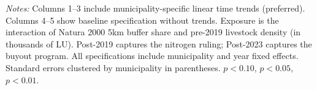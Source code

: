 \begin{table}[htbp]
\begin{threeparttable}
   \begin{tablenotes}
   \item \textit{Notes:} Columns 1--3 include municipality-specific linear time trends (preferred). Columns 4--5 show baseline specification without trends. Exposure is the interaction of Natura 2000 5km buffer share and pre-2019 livestock density (in thousands of LU). Post-2019 captures the nitrogen ruling; Post-2023 captures the buyout program. All specifications include municipality and year fixed effects. Standard errors clustered by municipality in parentheses. \sym{*} $p<0.10$, \sym{**} $p<0.05$, \sym{***} $p<0.01$.
   \end{tablenotes}
   \end{threeparttable}
\end{table}


